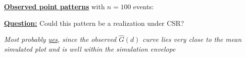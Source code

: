 \documentclass[portrait]{seminar}
\begin{document}
%
%
\begin{slide*}
\begin{center}
 \vspace*{-0.5cm} 
\end{center}


\vspace{0.2cm} \underline{\textbf{Observed point patterns}} with
$n=100$ events:

\vspace{0.0cm}
\begin{center}
\begin{figure}
\end{figure}
\end{center}

\vspace{0.1cm}\underline{\textbf{Question:}} Could this pattern be a
realization under CSR?

\begin{center}
\begin{figure}
\end{figure}
\end{center}

\vspace{-0.0cm}
\begin{center}
\emph{Most probably \underline{yes}, since the observed $\hat{G}(d)$
curve lies very close to the mean simulated plot and is well within
the simulation envelope}
\end{center}

\end{slide*}
\end{document}
